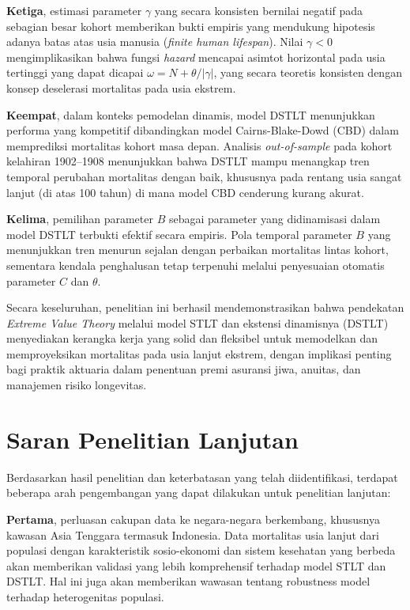 \textbf{Ketiga}, estimasi parameter $\gamma$ yang secara konsisten bernilai negatif pada sebagian besar kohort memberikan bukti empiris yang mendukung hipotesis adanya batas atas usia manusia (\textit{finite human lifespan}). Nilai $\gamma < 0$ mengimplikasikan bahwa fungsi \textit{hazard} mencapai asimtot horizontal pada usia tertinggi yang dapat dicapai $\omega = N + \theta/|\gamma|$, yang secara teoretis konsisten dengan konsep deselerasi mortalitas pada usia ekstrem.

\textbf{Keempat}, dalam konteks pemodelan dinamis, model DSTLT menunjukkan performa yang kompetitif dibandingkan model Cairns-Blake-Dowd (CBD) dalam memprediksi mortalitas kohort masa depan. Analisis \textit{out-of-sample} pada kohort kelahiran 1902--1908 menunjukkan bahwa DSTLT mampu menangkap tren temporal perubahan mortalitas dengan baik, khususnya pada rentang usia sangat lanjut (di atas 100 tahun) di mana model CBD cenderung kurang akurat.

\textbf{Kelima}, pemilihan parameter $B$ sebagai parameter yang didinamisasi dalam model DSTLT terbukti efektif secara empiris. Pola temporal parameter $B$ yang menunjukkan tren menurun sejalan dengan perbaikan mortalitas lintas kohort, sementara kendala penghalusan tetap terpenuhi melalui penyesuaian otomatis parameter $C$ dan $\theta$.

Secara keseluruhan, penelitian ini berhasil mendemonstrasikan bahwa pendekatan \textit{Extreme Value Theory} melalui model STLT dan ekstensi dinamisnya (DSTLT) menyediakan kerangka kerja yang solid dan fleksibel untuk memodelkan dan memproyeksikan mortalitas pada usia lanjut ekstrem, dengan implikasi penting bagi praktik aktuaria dalam penentuan premi asuransi jiwa, anuitas, dan manajemen risiko longevitas.

\section{Saran Penelitian Lanjutan}

Berdasarkan hasil penelitian dan keterbatasan yang telah diidentifikasi, terdapat beberapa arah pengembangan yang dapat dilakukan untuk penelitian lanjutan:

\textbf{Pertama}, perluasan cakupan data ke negara-negara berkembang, khususnya kawasan Asia Tenggara termasuk Indonesia. Data mortalitas usia lanjut dari populasi dengan karakteristik sosio-ekonomi dan sistem kesehatan yang berbeda akan memberikan validasi yang lebih komprehensif terhadap model STLT dan DSTLT. Hal ini juga akan memberikan wawasan tentang robustness model terhadap heterogenitas populasi.

